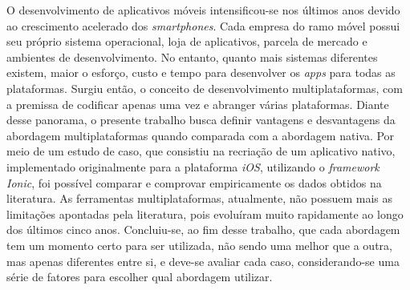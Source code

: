 \begin{resumo}
\begin{comment}
 O resumo deve ressaltar o objetivo, o método, os resultados e as conclusões 
 do documento. A ordem e a extensão
 destes itens dependem do tipo de resumo (informativo ou indicativo) e do
 tratamento que cada item recebe no documento original. O resumo deve ser
 precedido da referência do documento, com exceção do resumo inserido no
 próprio documento. (\ldots) As palavras-chave devem figurar logo abaixo do
 resumo, antecedidas da expressão Palavras-chave:, separadas entre si por
 ponto e finalizadas também por ponto. O texto pode conter no mínimo 150 e 
 no máximo 500 palavras, é aconselhável que sejam utilizadas 200 palavras. 
 E não se separa o texto do resumo em parágrafos.

 O desenvolvimento de aplicativos móveis cresceu muito nos últimos anos
 devido ao crescimento acelerado dos \textit{smartphones}. Com isso, surgiram 
 lojas de aplicativos, ambientes e \textit{SDK's} diferentes para 
 cada sistema operacional móvel. No entanto, quanto mais sistemas diferentes 
 existem, maior o esforço para desenvolver os \textit{apps} para todas 
 as plataformas. Com essa gama de plataformas diferentes, invariavelmente,
 o desenvolvedor precisará escolher qual plataforma irá seguir. Surge, então, uma forma 
 de desenvolvimento com a premissa de resolver 
 o problema da criação de um \textit{apps} para cada plataforma. 
 Essa solução ficou conhecida como desenvolvimento multiplataformas e possui
 vantagens e desvantagens em relação ao desenvolvimento nativo. Será feita uma
 pesquisa e um estudo de caso para avaliar essas vantagens e desvantagens de 
 maneira empírica e assim definir uma forma de escolher qual abordagem deve ser 
 adotada em cada caso específico.
\end{comment}

 O desenvolvimento de aplicativos móveis intensificou-se nos últimos anos devido ao crescimento acelerado dos \textit{smartphones}. Cada empresa
 do ramo móvel possui seu próprio sistema operacional, loja de aplicativos, parcela de mercado e ambientes de desenvolvimento. No entanto, quanto mais 
 sistemas diferentes existem, maior o esforço, custo e tempo para desenvolver os \textit{apps} para todas as plataformas. Surgiu então, o conceito de desenvolvimento multiplataformas,
 com a premissa de codificar apenas uma vez e abranger várias plataformas. Diante desse panorama, o presente trabalho busca definir vantagens e desvantagens da abordagem
 multiplataformas quando comparada com a abordagem nativa. Por meio de um estudo de caso, que consistiu na recriação de um aplicativo nativo, implementado originalmente para a plataforma \textit{iOS},
 utilizando o \textit{framework Ionic}, foi possível comparar e comprovar empiricamente os dados obtidos na literatura. As ferramentas multiplataformas, atualmente,
 não possuem mais as limitações apontadas pela literatura, pois evoluíram muito rapidamente ao longo dos últimos cinco anos. Concluiu-se, ao fim desse trabalho, que cada abordagem tem um momento certo
 para ser utilizada, não sendo uma melhor que a outra, mas apenas diferentes entre si, e deve-se avaliar cada caso, considerando-se uma série de fatores para escolher qual abordagem utilizar.


\end{resumo}
